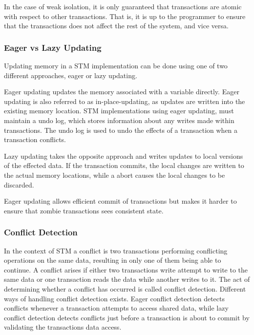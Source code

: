 In the case of weak isolation, it is only guaranteed that transactions are atomic with respect to other transactions. That is, it is up to the programmer to ensure that the transactions does not affect the rest of the system, and vice versa. 

\subsubsection{Eager vs Lazy Updating}
Updating memory in a \ac{STM} implementation can be done using one of two different approaches, eager or lazy updating.

Eager updating updates the memory associated with a variable directly. Eager updating is also referred to as in-place-updating, as updates are written into the existing memory location\cite[p. 35]{afek2011lowering}. \ac{STM} implementations using eager updating, must maintain a undo log, which stores information about any writes made within transactions. The undo log is used to undo the effects of a transaction when a transaction conflicts\cite[p. 2084]{herlihy2011tm}.

Lazy updating takes the opposite approach and writes updates to local versions of the effected data\cite[p. 2084]{herlihy2011tm}. If the transaction commits, the local changes are written to the actual memory locations, while a abort causes the local changes to be discarded.

Eager updating allows efficient commit of transactions but makes it harder to ensure that zombie transactions sees consistent state\cite[p. 2084]{herlihy2011tm}.

\subsubsection{Conflict Detection}
In the context of \ac{STM} a conflict is two transactions performing conflicting operations on the same data, resulting in only one of them being able to continue\cite[p. 20]{harris2010transactional}. A conflict arises if either two transactions write attempt to write to the same data or one transaction reads the data while another writes to it. The act of determining whether a conflict has occurred is called conflict detection\cite[p. 20]{harris2010transactional}. Different ways of handling conflict detection exists. Eager conflict detection detects conflicts whenever a transaction attempts to access shared data, while lazy conflict detection detects conflicts just before a transaction is about to commit by validating the transactions data access\cite[p. 21]{harris2010transactional}. 

